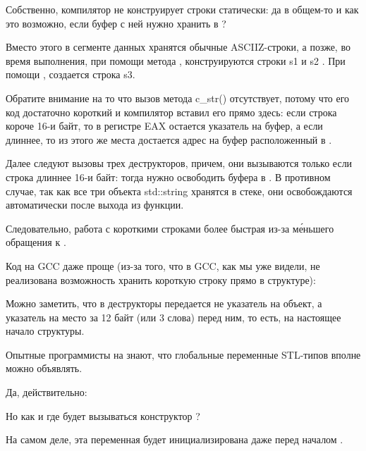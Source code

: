 

Собственно, компилятор не конструирует строки статически: да в общем-то и как
это возможно, если буфер с ней нужно хранить в ?

Вместо этого в сегменте данных хранятся обычные \ac{ASCIIZ}-строки, а позже, во время выполнения, 
при помощи метода , конструируются строки s1 и s2
.
При помощи , создается строка s3.

Обратите внимание на то что вызов метода c\_str() отсутствует,
потому что его код достаточно короткий и компилятор вставил его прямо здесь:
если строка короче 16-и байт, то в регистре EAX остается указатель на буфер,
а если длиннее, то из этого же места достается адрес на буфер расположенный в .

Далее следуют вызовы трех деструкторов, причем, они вызываются только если строка длиннее 16-и байт:
тогда нужно освободить буфера в .
В противном случае, так как все три объекта std::string хранятся в стеке,
они освобождаются автоматически после выхода из функции.

Следовательно, работа с короткими строками более быстрая из-за м\'{е}ньшего обращения к .

Код на GCC даже проще (из-за того, что в GCC, как мы уже видели, не реализована возможность хранить короткую
строку прямо в структуре):



Можно заметить, что в деструкторы передается не указатель на объект,
а указатель на место за 12 байт (или 3 слова) перед ним, то есть, на настоящее начало структуры.

\label{sec:std_string_as_global_variable}

Опытные программисты на \Cpp знают, что глобальные переменные \ac{STL}-типов вполне можно объявлять.

Да, действительно:



Но как и где будет вызываться конструктор ?

На самом деле, эта переменная будет инициализирована даже перед началом \main.




